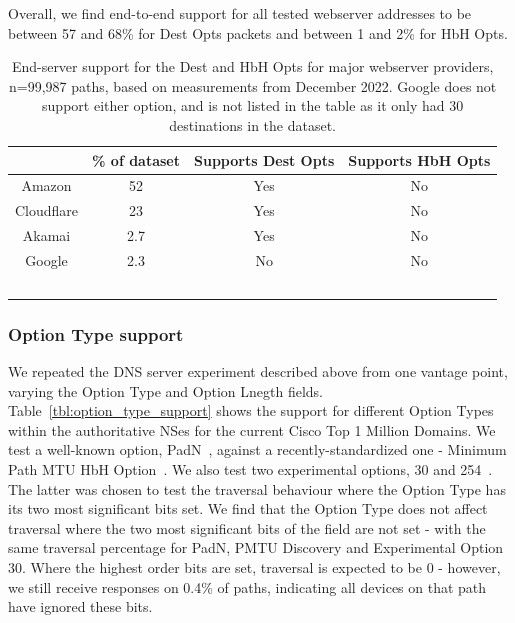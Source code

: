 \documentclass[conference]{IEEEtran}
\begin{document}
Overall, we find end-to-end support for all tested webserver addresses to be between 57 and 68\% for Dest Opts packets and between 1 and 2\% for HbH Opts.


\begin{table}[]
\begin{tabular}{c|c|c|c}
           & \% of dataset & Supports Dest Opts & Supports HbH Opts \\
\hline
Amazon & 52                      & Yes                & No                 \\
\hline
Cloudflare     & 23                     & Yes                 & No                 \\
\hline
Akamai    & 2.7                     & Yes                & No                 \\
\hline
Google      & 2.3                     & No                 & No                 \\
\
\end{tabular}
\label{tbl:web_provider_support}
\caption{End-server support for the Dest and HbH Opts for major webserver providers, n=99,987 paths, based on measurements from December 2022. Google does not support either option, and is not listed in the table as it only had 30 destinations in the dataset.
}
\end{table}


\subsubsection{Option Type support}

We repeated the DNS server experiment described above from one vantage point, varying the Option Type and Option Lnegth fields. 
Table~\ref{tbl:option_type_support} shows the support for different Option Types within the authoritative NSes for the current Cisco Top 1 Million Domains. We test a well-known option, PadN~\cite{rfc2460}, against a recently-standardized one - Minimum Path MTU HbH Option~\cite{rfc9268}. We also test two experimental options, 30 and 254~\cite{RFC4727}. The latter was chosen to test the traversal behaviour where the Option Type has its two most significant bits set.
We find that the Option Type does not affect traversal where the two most significant bits of the field are not set - with the same traversal percentage for PadN, PMTU Discovery and Experimental Option 30. Where the highest order bits are set, traversal is expected to be 0 - however, we still receive responses on 0.4\% of paths, indicating all devices on that path have ignored these bits.
\end{document}
